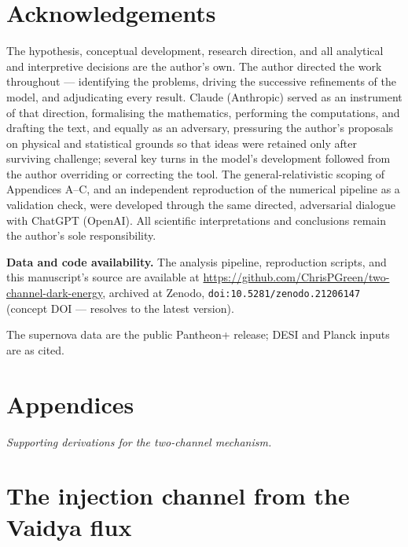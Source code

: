 \documentclass[11pt,a4paper]{article}
\begin{document}
\section*{Acknowledgements}

The hypothesis, conceptual development, research direction, and all analytical and interpretive decisions are the author's own. The author directed the work throughout --- identifying the problems, driving the successive refinements of the model, and adjudicating every result. Claude (Anthropic) served as an instrument of that direction, formalising the mathematics, performing the computations, and drafting the text, and equally as an adversary, pressuring the author's proposals on physical and statistical grounds so that ideas were retained only after surviving challenge; several key turns in the model's development followed from the author overriding or correcting the tool. The general-relativistic scoping of Appendices A--C, and an independent reproduction of the numerical pipeline as a validation check, were developed through the same directed, adversarial dialogue with ChatGPT (OpenAI). All scientific interpretations and conclusions remain the author's sole responsibility.

{\sloppy\vspace{0.5em}\noindent\textbf{Data and code availability.} The analysis pipeline, reproduction scripts, and this manuscript's source are available at \url{https://github.com/ChrisPGreen/two-channel-dark-energy}, archived at Zenodo, \texttt{doi:10.5281/zenodo.21206147} (concept DOI --- resolves to the latest version).\par} The supernova data are the public Pantheon+ release; DESI and Planck inputs are as cited.

\appendix

\section*{Appendices}
\noindent\textit{Supporting derivations for the two-channel mechanism.}

\section{The injection channel from the Vaidya flux}\label{app:vaidya}
\end{document}
